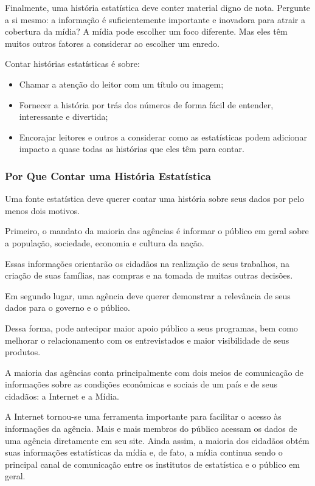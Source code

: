 Finalmente, uma história estatística deve conter material digno de nota. Pergunte a si mesmo: a informação é suficientemente importante e inovadora para atrair a cobertura da mídia? A mídia pode escolher um foco diferente. Mas eles têm muitos outros fatores a considerar ao escolher um enredo.

\newpage
Contar histórias estatísticas é sobre:

\begin{itemize}
    \item Chamar a atenção do leitor com um título ou imagem;
    \item Fornecer a história por trás dos números de forma fácil de entender, interessante e divertida;
    \item Encorajar leitores e outros a considerar como as estatísticas podem adicionar impacto a quase todas as histórias que eles têm para contar.
\end{itemize}




\subsubsection{Por Que Contar uma História Estatística}

Uma fonte estatística deve querer contar uma história sobre seus dados por pelo menos dois motivos. \vskip0.3cm 

Primeiro, o mandato da maioria das agências é informar o público em geral sobre a população, sociedade, economia e cultura da nação.\vskip0.3cm 

Essas informações orientarão os cidadãos na realização de seus trabalhos, na criação de suas famílias, nas compras e na tomada de muitas outras decisões.\vskip0.3cm 

Em segundo lugar, uma agência deve querer demonstrar a relevância de seus dados para o governo e o público.\vskip0.3cm 

Dessa forma, pode antecipar maior apoio público a seus programas, bem como melhorar o relacionamento com os entrevistados e maior visibilidade de seus produtos.\vskip0.3cm 

A maioria das agências conta principalmente com dois meios de comunicação de informações sobre as condições econômicas e sociais de um país e de seus cidadãos: a Internet e a Mídia.\vskip0.3cm 

A Internet tornou-se uma ferramenta importante para facilitar o acesso às informações da agência. Mais e mais membros do público acessam os dados de uma agência diretamente em seu site. Ainda assim, a maioria dos cidadãos obtém suas informações estatísticas da mídia e, de fato, a mídia continua sendo o principal canal de comunicação entre os institutos de estatística e o público em geral.\vskip0.3cm 


